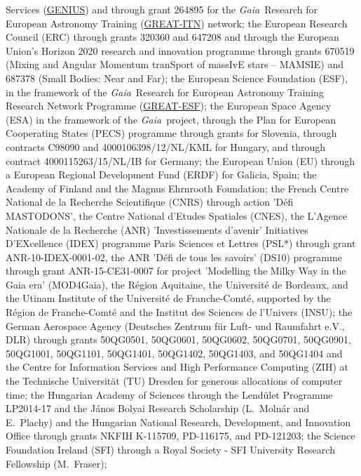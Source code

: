 \documentclass[longauth]{aa_gaia} %
\newcommand\gaia{\textit{Gaia}}
\begin{document}
\begin{acknowledgements}
Services (\href{https://gaia.ub.edu/twiki/do/view/GENIUS/WebHome}{GENIUS}) and through grant 264895 for the \gaia\
Research for European Astronomy Training
(\href{https://www.cosmos.esa.int/web/gaia/great-programme}{GREAT-ITN}) network;
the European Research Council (ERC) through grants 320360 and 647208 and through the European
Union’s Horizon 2020 research and innovation programme through grants 670519 (Mixing and Angular
Momentum tranSport of massIvE stars -- MAMSIE) and 687378 (Small Bodies: Near and Far);
the European Science Foundation (ESF), in the framework of the \gaia\ Research for European
Astronomy Training Research Network Programme
(\href{https://www.cosmos.esa.int/web/gaia/great-programme}{GREAT-ESF});
the European Space Agency (ESA) in the framework of the \gaia\ project, through the Plan for
European Cooperating States (PECS) programme through grants for Slovenia, through contracts C98090
and 4000106398/12/NL/KML for Hungary, and through contract 4000115263/15/NL/IB for Germany;
the European Union (EU) through a European Regional Development Fund (ERDF) for Galicia, Spain;    
the Academy of Finland and the Magnus Ehrnrooth Foundation;
the French Centre National de la Recherche Scientifique (CNRS) through action 'D\'efi MASTODONS',
the Centre National d'Etudes Spatiales (CNES), the L'Agence Nationale de la Recherche (ANR)
'Investissements d'avenir' Initiatives D’EXcellence (IDEX) programme Paris Sciences et Lettres
(PSL$\ast$) through grant ANR-10-IDEX-0001-02, the ANR 'D\'{e}fi de tous les savoirs' (DS10)
programme through grant ANR-15-CE31-0007 for project 'Modelling the Milky Way in the Gaia era'
(MOD4Gaia), the R\'egion Aquitaine, the Universit\'e de Bordeaux, and the Utinam Institute of the
Universit\'e de Franche-Comt\'e, supported by the R\'egion de Franche-Comt\'e and the Institut des
Sciences de l'Univers (INSU);
the German Aerospace Agency (Deutsches Zentrum f\"{u}r Luft- und Raumfahrt e.V., DLR) through grants
50QG0501, 50QG0601, 50QG0602, 50QG0701, 50QG0901, 50QG1001, 50QG1101, 50QG1401, 50QG1402, 50QG1403,
and 50QG1404 and the Centre for Information Services and High Performance Computing (ZIH) at the
Technische Universit\"{a}t (TU) Dresden for generous allocations of computer time;
the Hungarian Academy of Sciences through the Lend\"ulet Programme LP2014-17 and the J\'anos Bolyai
Research Scholarship (L.~Moln\'ar and E.~Plachy) and the Hungarian National Research, Development,
and Innovation Office through grants NKFIH K-115709, PD-116175, and PD-121203;
the Science Foundation Ireland (SFI) through a Royal Society - SFI University Research Fellowship (M.~Fraser);

\end{acknowledgements}
\end{document}
